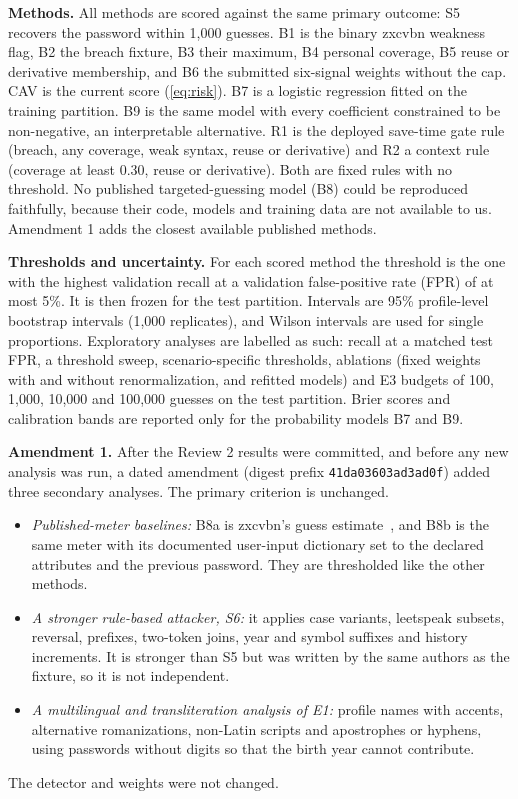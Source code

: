 \documentclass[preprint,12pt]{elsarticle}
\begin{document}
\textbf{Methods.} All methods are scored against the same primary outcome: S5 recovers the password within 1,000 guesses. B1 is the binary zxcvbn weakness flag, B2 the breach fixture, B3 their maximum, B4 personal coverage, B5 reuse or derivative membership, and B6 the submitted six-signal weights without the cap. CAV is the current score (\ref{eq:risk}). B7 is a logistic regression fitted on the training partition. B9 is the same model with every coefficient constrained to be non-negative, an interpretable alternative. R1 is the deployed save-time gate rule (breach, any coverage, weak syntax, reuse or derivative) and R2 a context rule (coverage at least 0.30, reuse or derivative). Both are fixed rules with no threshold. No published targeted-guessing model (B8) could be reproduced faithfully, because their code, models and training data are not available to us. Amendment 1 adds the closest available published methods.

\textbf{Thresholds and uncertainty.} For each scored method the threshold is the one with the highest validation recall at a validation false-positive rate (FPR) of at most 5\%. It is then frozen for the test partition. Intervals are 95\% profile-level bootstrap intervals (1,000 replicates), and Wilson intervals are used for single proportions. Exploratory analyses are labelled as such: recall at a matched test FPR, a threshold sweep, scenario-specific thresholds, ablations (fixed weights with and without renormalization, and refitted models) and E3 budgets of 100, 1,000, 10,000 and 100,000 guesses on the test partition. Brier scores and calibration bands are reported only for the probability models B7 and B9.

\textbf{Amendment 1.} After the Review 2 results were committed, and before any new analysis was run, a dated amendment (digest prefix \texttt{41da03603ad3ad0f}) added three secondary analyses. The primary criterion is unchanged.
\begin{itemize}
\item \emph{Published-meter baselines:} B8a is zxcvbn's guess estimate~\cite{wheeler}, and B8b is the same meter with its documented user-input dictionary set to the declared attributes and the previous password. They are thresholded like the other methods.
\item \emph{A stronger rule-based attacker, S6:} it applies case variants, leetspeak subsets, reversal, prefixes, two-token joins, year and symbol suffixes and history increments. It is stronger than S5 but was written by the same authors as the fixture, so it is not independent.
\item \emph{A multilingual and transliteration analysis of E1:} profile names with accents, alternative romanizations, non-Latin scripts and apostrophes or hyphens, using passwords without digits so that the birth year cannot contribute.
\end{itemize}
The detector and weights were not changed.
\end{document}
